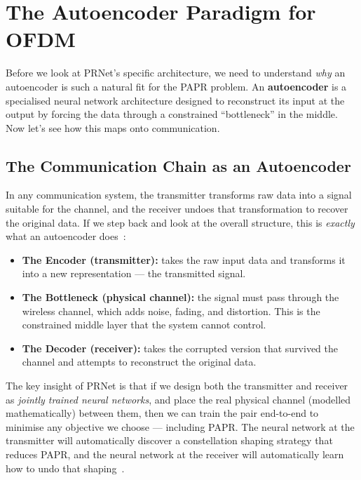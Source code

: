 \section{The Autoencoder Paradigm for OFDM}
\label{sec:prnet_autoencoder}

Before we look at PRNet's specific architecture, we need to understand
\emph{why} an autoencoder is such a natural fit for the PAPR problem.
An \textbf{autoencoder} is a specialised neural network architecture 
designed to reconstruct its input at the output by forcing the data through a
constrained ``bottleneck'' in the middle.  Now let's see how this maps onto
communication.


\subsection{The Communication Chain as an Autoencoder}

In any communication system, the transmitter transforms raw data into a signal
suitable for the channel, and the receiver undoes that transformation to recover
the original data.  If we step back and look at the overall structure, this is
\emph{exactly} what an autoencoder does~\cite{kim2017novel}:

\begin{itemize}
    \item \textbf{The Encoder (transmitter):} takes the raw input data and
          transforms it into a new representation --- the transmitted signal.
    \item \textbf{The Bottleneck (physical channel):} the signal must pass
          through the wireless channel, which adds noise, fading, and
          distortion.  This is the constrained middle layer that the system
          cannot control.
    \item \textbf{The Decoder (receiver):} takes the corrupted version that
          survived the channel and attempts to reconstruct the original data.
\end{itemize}

The key insight of PRNet is that if we design both the transmitter and receiver
as \emph{jointly trained neural networks}, and place the real physical channel
(modelled mathematically) between them, then we can train the pair end-to-end
to minimise any objective we choose --- including PAPR.  The neural network at
the transmitter will automatically discover a constellation shaping strategy
that reduces PAPR, and the neural network at the receiver will automatically
learn how to undo that shaping~\cite{kim2017novel}.


